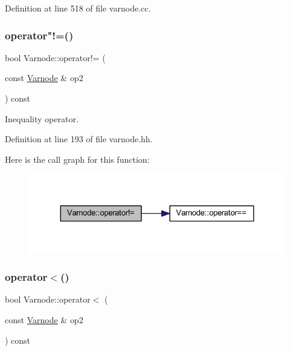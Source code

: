 Definition at line 518 of file varnode.\+cc.

\mbox{\label{class_varnode_a77f70431d1dd91c528a8a6fa445ce0f9}} 
\subsubsection{\texorpdfstring{operator"!=()}{operator!=()}}
{\footnotesize\ttfamily bool Varnode\+::operator!= (\begin{DoxyParamCaption}\item[{const \mbox{\hyperlink{class_varnode}{Varnode}} \&}]{op2 }\end{DoxyParamCaption}) const\hspace{0.3cm}{\ttfamily [inline]}}



Inequality operator. 



Definition at line 193 of file varnode.\+hh.

Here is the call graph for this function\+:
\nopagebreak
\begin{figure}[H]
\begin{center}
\leavevmode
\includegraphics[width=324pt]{class_varnode_a77f70431d1dd91c528a8a6fa445ce0f9_cgraph}
\end{center}
\end{figure}
\mbox{\label{class_varnode_a3a2b6667e362e55c82ab0c983693ad92}} 
\subsubsection{\texorpdfstring{operator$<$()}{operator<()}}
{\footnotesize\ttfamily bool Varnode\+::operator$<$ (\begin{DoxyParamCaption}\item[{const \mbox{\hyperlink{class_varnode}{Varnode}} \&}]{op2 }\end{DoxyParamCaption}) const}



